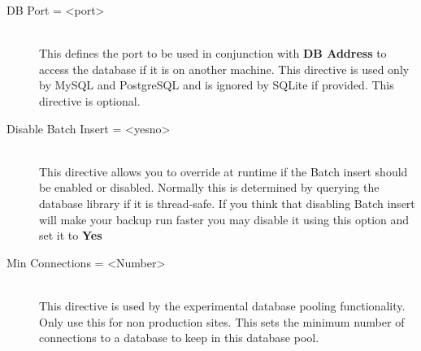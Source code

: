 \begin{description}
\item [DB Port = {\textless}port{\textgreater}] \hfill \\
This defines the port to  be used in conjunction with {\bf DB Address} to
access the  database if it is on another machine. This directive is used  only
by MySQL and PostgreSQL and is ignored by SQLite if provided.  This
directive is optional.



\item [Disable Batch Insert = {\textless}yes{\textbar}no{\textgreater}] \hfill \\
This directive allows you to override at runtime if the Batch insert should
be enabled or disabled. Normally this is determined by querying the database
library if it is thread-safe. If you think that disabling Batch insert will make
your backup run faster you may disable it using this option and set it to {\bf Yes}

\item [Min Connections = {\textless}Number{\textgreater}] \hfill \\
This directive is used by the experimental database pooling functionality. Only use
this for non production sites. This sets the minimum number of connections to a
database to keep in this database pool.


\end{description}
